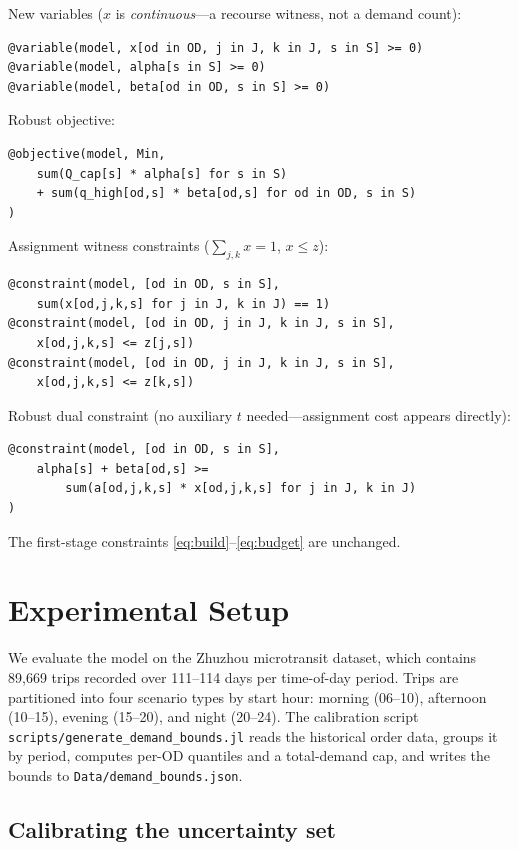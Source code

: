 \documentclass[11pt]{article}
\theoremstyle{definition}
\begin{document}
New variables ($x$ is \emph{continuous}---a recourse witness, not a demand count):
\begin{verbatim}
@variable(model, x[od in OD, j in J, k in J, s in S] >= 0)
@variable(model, alpha[s in S] >= 0)
@variable(model, beta[od in OD, s in S] >= 0)
\end{verbatim}

Robust objective:
\begin{verbatim}
@objective(model, Min,
    sum(Q_cap[s] * alpha[s] for s in S)
    + sum(q_high[od,s] * beta[od,s] for od in OD, s in S)
)
\end{verbatim}

Assignment witness constraints ($\sum_{j,k} x = 1$, $x \le z$):
\begin{verbatim}
@constraint(model, [od in OD, s in S],
    sum(x[od,j,k,s] for j in J, k in J) == 1)
@constraint(model, [od in OD, j in J, k in J, s in S],
    x[od,j,k,s] <= z[j,s])
@constraint(model, [od in OD, j in J, k in J, s in S],
    x[od,j,k,s] <= z[k,s])
\end{verbatim}

Robust dual constraint (no auxiliary $t$ needed---assignment cost appears directly):
\begin{verbatim}
@constraint(model, [od in OD, s in S],
    alpha[s] + beta[od,s] >=
        sum(a[od,j,k,s] * x[od,j,k,s] for j in J, k in J)
)
\end{verbatim}

The first-stage constraints \eqref{eq:build}--\eqref{eq:budget} are unchanged.

\section{Experimental Setup}
\label{sec:experiment}

We evaluate the model on the Zhuzhou microtransit dataset, which contains
89{,}669 trips recorded over 111--114 days per time-of-day period.  Trips are
partitioned into four scenario types by start hour: morning (06--10), afternoon
(10--15), evening (15--20), and night (20--24).  The calibration script
\texttt{scripts/generate\_demand\_bounds.jl} reads the historical order data,
groups it by period, computes per-OD quantiles and a total-demand cap, and writes
the bounds to \texttt{Data/demand\_bounds.json}.

\subsection{Calibrating the uncertainty set}
\label{sec:calibration}
\end{document}
